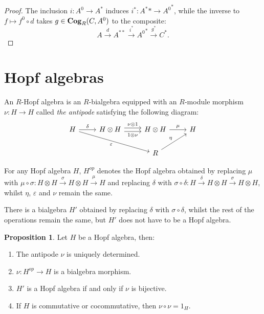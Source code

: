 \documentclass[8pt]{article}
\theoremstyle{definition}
\theoremstyle{definition}
\theoremstyle{definition}
\theoremstyle{definition}
\theoremstyle{definition}
\theoremstyle{definition}
\theoremstyle{definition}
\newtheorem{prop}{Proposition}[section]
\theoremstyle{definition}
\theoremstyle{definition}
\theoremstyle{definition}
\theoremstyle{definition}
\theoremstyle{definition}
\theoremstyle{definition}
\theoremstyle{definition}
\theoremstyle{question}
\begin{document}
\begin{proof}
  The inclusion $i : A^0 \to A^*$ induces $i^* : A^** \to {A^0}^*$, while 
  the inverse to $f \mapsto f^0 \circ d$ takes $g \in {\bf Cog}_R(C, A^0)$ to the composite:
  \[
  A \xrightarrow{d} A^{**} \xrightarrow{i^*} {A^0}^* \xrightarrow{g^*} C^*.
  \]
\end{proof}

\section{Hopf algebras}

An $R$-Hopf algebra is an $R$-bialgebra equipped with an $R$-module morphism $\nu : H \to H$ called \emph{the antipode}
satisfying the following diagram:
\[
\begin{tikzcd}
  H \ar[r, "\delta"] \ar[drr, "\varepsilon"']  & H \otimes H \arrow[r, shift left, "\nu \otimes 1"] \arrow[r, shift right, "1 \otimes \nu"'] & H \otimes H \ar[r, "\mu"] & H \\
  && R \ar[ur, "\eta"] 
\end{tikzcd}
\]

For any Hopf algebra $H$, $H^{op}$ denotes the Hopf algebra obtained by replacing $\mu$ with 
$\mu \circ \sigma : H \otimes H \xrightarrow{\sigma} H \otimes H \xrightarrow{\mu} H$
and replacing $\delta$ with $\sigma \circ \delta : H \xrightarrow{\delta} H \otimes H \xrightarrow{\sigma} H \otimes H$,
whilst $\eta$, $\varepsilon$ and $\nu$ remain the same.

There is a bialgebra $H'$ obtained by replacing $\delta$ with $\sigma \circ \delta$, whilst the rest of the operations remain the same,
but $H'$ does not have to be a Hopf algebra.

\begin{prop} Let $H$ be a Hopf algebra, then:

  \begin{enumerate}
    \item The antipode $\nu$ is uniquely determined.
    \item $\nu : H^{op} \to H$ is a bialgebra morphism.
    \item $H'$ is a Hopf algebra if and only if $\nu$ is bijective.
    \item If $H$ is commutative or cocommutative, then $\nu \circ \nu = 1_H$.
  \end{enumerate}
\end{prop}
\end{document}

